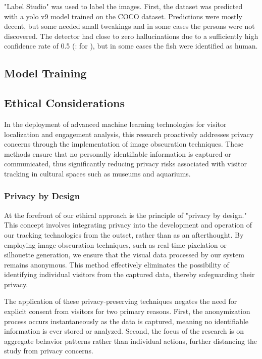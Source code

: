 "Label Studio" was used to label the images. First, the dataset was predicted with a yolo v9 model trained on the COCO dataset. Predictions were mostly decent, but some needed small tweakings and in some cases the persons were not discovered. The detector had close to zero hallucinations due to a sufficiently high confidence rate of 0.5 (: for ), but in some cases the fish were identified as human.

\subsection{Model Training}
\label{sec:model_training}

\subsection{Ethical Considerations}
In the deployment of advanced machine learning technologies for visitor localization and engagement analysis, this research proactively addresses privacy concerns through the implementation of image obscuration techniques. These methods ensure that no personally identifiable information is captured or communicated, thus significantly reducing privacy risks associated with visitor tracking in cultural spaces such as museums and aquariums.

\subsubsection{Privacy by Design}
At the forefront of our ethical approach is the principle of "privacy by design." This concept involves integrating privacy into the development and operation of our tracking technologies from the outset, rather than as an afterthought. By employing image obscuration techniques, such as real-time pixelation or silhouette generation, we ensure that the visual data processed by our system remains anonymous. This method effectively eliminates the possibility of identifying individual visitors from the captured data, thereby safeguarding their privacy.

The application of these privacy-preserving techniques negates the need for explicit consent from visitors for two primary reasons. First, the anonymization process occurs instantaneously as the data is captured, meaning no identifiable information is ever stored or analyzed. Second, the focus of the research is on aggregate behavior patterns rather than individual actions, further distancing the study from privacy concerns.

